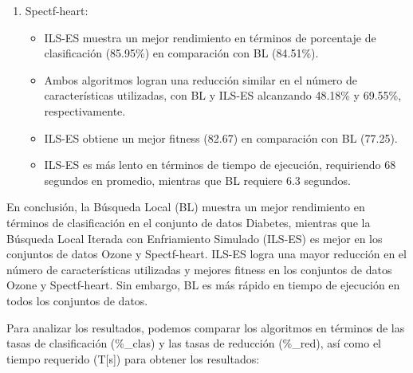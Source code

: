 \begin{enumerate}
\item Spectf-heart:

\begin{itemize}
\item ILS-ES muestra un mejor rendimiento en términos de porcentaje de clasificación (85.95\%) en comparación con BL (84.51\%).
\item Ambos algoritmos logran una reducción similar en el número de características utilizadas, con BL y ILS-ES alcanzando 48.18\% y 69.55\%, respectivamente.
\item ILS-ES obtiene un mejor fitness (82.67) en comparación con BL (77.25).
\item ILS-ES es más lento en términos de tiempo de ejecución, requiriendo 68 segundos en promedio, mientras que BL requiere 6.3 segundos.
\end{itemize}


\end{enumerate}

En conclusión, la Búsqueda Local (BL) muestra un mejor rendimiento en términos de clasificación en el conjunto de datos Diabetes, mientras que la Búsqueda Local Iterada con Enfriamiento Simulado (ILS-ES) es mejor en los conjuntos de datos Ozone y Spectf-heart. ILS-ES logra una mayor reducción en el número de características utilizadas y mejores fitness en los conjuntos de datos Ozone y Spectf-heart. Sin embargo, BL es más rápido en tiempo de ejecución en todos los conjuntos de datos.



Para analizar los resultados, podemos comparar los algoritmos en términos de las tasas de clasificación (\%\_clas) y las tasas de reducción (\%\_red), así como el tiempo requerido (T[s]) para obtener los resultados:
	
